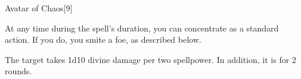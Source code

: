 \begin{spellsection}{Avatar of Chaos}[9]
    \begin{spellheader}
    \end{spellheader}
    \begin{spellcontent}
        \begin{spelltargetinginfo}
        \end{spelltargetinginfo}
        \begin{spelleffects}
            \spelleffect At any time during the spell's duration, you can concentrate as a standard action. If you do, you smite a foe, as described below.
            \spelldur \durlong
        \end{spelleffects}
    \end{spellcontent}
    \begin{spellsubcontent}
        \begin{spelltargetinginfo}
        \end{spelltargetinginfo}
        \begin{spelleffects}
            \spelleffect The target takes 1d10 divine damage per two spellpower. In addition, it is \disoriented for 2 rounds.
        \end{spelleffects}
    \end{spellsubcontent}
    \begin{spellfooter}
        \miscastexplode
    \end{spellfooter}
\end{spellsection}

